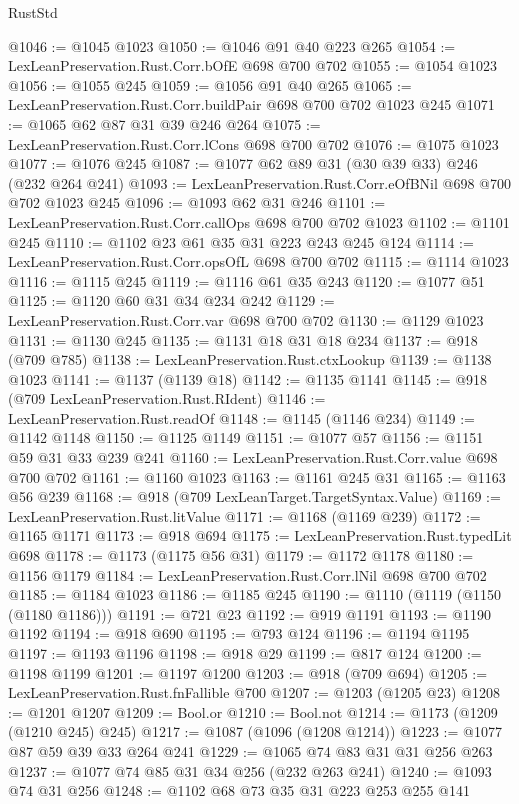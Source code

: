 \begin{lexlean}{RustStd}
\begin{coremodule}
@1046 := @1045 @1023
@1050 := @1046 @91 @40 @223 @265
@1054 := LexLeanPreservation.Rust.Corr.bOfE @698 @700 @702
@1055 := @1054 @1023
@1056 := @1055 @245
@1059 := @1056 @91 @40 @265
@1065 := LexLeanPreservation.Rust.Corr.buildPair @698 @700 @702 @1023 @245
@1071 := @1065 @62 @87 @31 @39 @246 @264
@1075 := LexLeanPreservation.Rust.Corr.lCons @698 @700 @702
@1076 := @1075 @1023
@1077 := @1076 @245
@1087 := @1077 @62 @89 @31 (@30 @39 @33) @246 (@232 @264 @241)
@1093 := LexLeanPreservation.Rust.Corr.eOfBNil @698 @700 @702 @1023 @245
@1096 := @1093 @62 @31 @246
@1101 := LexLeanPreservation.Rust.Corr.callOps @698 @700 @702 @1023
@1102 := @1101 @245
@1110 := @1102 @23 @61 @35 @31 @223 @243 @245 @124
@1114 := LexLeanPreservation.Rust.Corr.opsOfL @698 @700 @702
@1115 := @1114 @1023
@1116 := @1115 @245
@1119 := @1116 @61 @35 @243
@1120 := @1077 @51
@1125 := @1120 @60 @31 @34 @234 @242
@1129 := LexLeanPreservation.Rust.Corr.var @698 @700 @702
@1130 := @1129 @1023
@1131 := @1130 @245
@1135 := @1131 @18 @31 @18 @234
@1137 := @918 (@709 @785)
@1138 := LexLeanPreservation.Rust.ctxLookup
@1139 := @1138 @1023
@1141 := @1137 (@1139 @18)
@1142 := @1135 @1141
@1145 := @918 (@709 LexLeanPreservation.Rust.RIdent)
@1146 := LexLeanPreservation.Rust.readOf
@1148 := @1145 (@1146 @234)
@1149 := @1142 @1148
@1150 := @1125 @1149
@1151 := @1077 @57
@1156 := @1151 @59 @31 @33 @239 @241
@1160 := LexLeanPreservation.Rust.Corr.value @698 @700 @702
@1161 := @1160 @1023
@1163 := @1161 @245 @31
@1165 := @1163 @56 @239
@1168 := @918 (@709 LexLeanTarget.TargetSyntax.Value)
@1169 := LexLeanPreservation.Rust.litValue
@1171 := @1168 (@1169 @239)
@1172 := @1165 @1171
@1173 := @918 @694
@1175 := LexLeanPreservation.Rust.typedLit @698
@1178 := @1173 (@1175 @56 @31)
@1179 := @1172 @1178
@1180 := @1156 @1179
@1184 := LexLeanPreservation.Rust.Corr.lNil @698 @700 @702
@1185 := @1184 @1023
@1186 := @1185 @245
@1190 := @1110 (@1119 (@1150 (@1180 @1186)))
@1191 := @721 @23
@1192 := @919 @1191
@1193 := @1190 @1192
@1194 := @918 @690
@1195 := @793 @124
@1196 := @1194 @1195
@1197 := @1193 @1196
@1198 := @918 @29
@1199 := @817 @124
@1200 := @1198 @1199
@1201 := @1197 @1200
@1203 := @918 (@709 @694)
@1205 := LexLeanPreservation.Rust.fnFallible @700
@1207 := @1203 (@1205 @23)
@1208 := @1201 @1207
@1209 := Bool.or
@1210 := Bool.not
@1214 := @1173 (@1209 (@1210 @245) @245)
@1217 := @1087 (@1096 (@1208 @1214))
@1223 := @1077 @87 @59 @39 @33 @264 @241
@1229 := @1065 @74 @83 @31 @31 @256 @263
@1237 := @1077 @74 @85 @31 @34 @256 (@232 @263 @241)
@1240 := @1093 @74 @31 @256
@1248 := @1102 @68 @73 @35 @31 @223 @253 @255 @141

\end{coremodule}
\end{lexlean}
